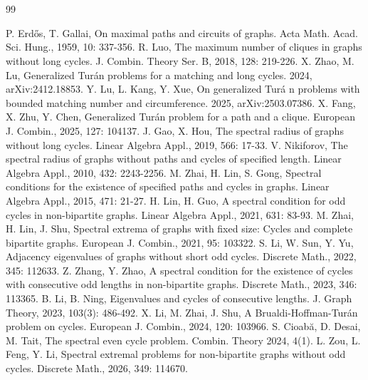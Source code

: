 \documentclass[preprint,12pt]{elsarticle}
\begin{document}
\vspace{3mm}

\noindent
\textbf{}
\vspace{3mm}
\noindent


\section*{}
		\begin{thebibliography}{99}

 P. Erd\H{o}s, T. Gallai, On maximal paths and circuits of graphs. Acta Math. Acad. Sci. Hung., 1959, 10: 337-356.
 R. Luo, The maximum number of cliques in graphs without long cycles. J. Combin. Theory Ser. B, 2018, 128: 219-226.
 X. Zhao, M. Lu, Generalized Tur\'{a}n problems for a matching and long cycles. 2024, arXiv:2412.18853.
 Y. Lu, L. Kang, Y. Xue, On generalized Tur\'{a} n problems with bounded matching number and circumference. 2025, arXiv:2503.07386.
 X. Fang, X. Zhu, Y. Chen, Generalized Tur\'{a}n problem for a path and a clique. European J. Combin., 2025, 127: 104137.
 J. Gao, X. Hou, The spectral radius of graphs without long cycles. Linear Algebra Appl., 2019, 566: 17-33.
 V. Nikiforov, The spectral radius of graphs without paths and cycles of specified length. Linear Algebra Appl., 2010, 432: 2243-2256.
 M. Zhai, H. Lin, S. Gong, Spectral conditions for the existence of specified paths and cycles in graphs. Linear Algebra Appl., 2015, 471: 21-27.
 H. Lin, H. Guo, A spectral condition for odd cycles in non-bipartite graphs. Linear Algebra Appl., 2021, 631: 83-93.
 M. Zhai, H. Lin, J. Shu, Spectral extrema of graphs with fixed size: Cycles and complete bipartite graphs. European J. Combin., 2021, 95: 103322.
 S. Li, W. Sun, Y. Yu, Adjacency eigenvalues of graphs without short odd cycles. Discrete Math., 2022, 345: 112633.
 Z. Zhang, Y. Zhao, A spectral condition for the existence of cycles with consecutive odd lengths in non-bipartite graphs. Discrete Math., 2023, 346: 113365.
 B. Li, B. Ning, Eigenvalues and cycles of consecutive lengths. J. Graph Theory, 2023, 103(3): 486-492.
 X. Li, M. Zhai, J. Shu, A Brualdi-Hoffman-Tur\'{a}n problem on cycles. European J. Combin., 2024, 120: 103966.
 S. Cioab\u{a}, D. Desai, M. Tait, The spectral even cycle problem. Combin. Theory 2024, 4(1).
 L. Zou, L. Feng, Y. Li, Spectral extremal problems for non-bipartite graphs without odd cycles. Discrete Math., 2026, 349: 114670.

\end{thebibliography}
\end{document}
